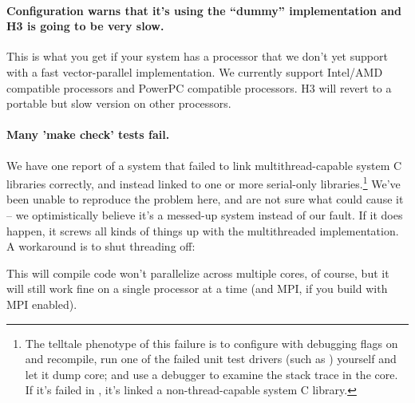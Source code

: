 
\paragraph{Configuration warns that it's using the ``dummy''
implementation and H3 is going to be very slow.} This is what you get if
your system has a processor that we don't yet support with a fast
vector-parallel implementation. We currently support Intel/AMD
compatible processors and PowerPC compatible processors.  H3 will
revert to a portable but slow version on other processors.

\paragraph{Many 'make check' tests fail.} We have one report of a
system that failed to link multithread-capable system C libraries
correctly, and instead linked to one or more serial-only
libraries.\footnote{The telltale phenotype of this failure is to
  configure with debugging flags on and recompile, run one of the
  failed unit test drivers (such as )
  yourself and let it dump core; and use a debugger to examine the
  stack trace in the core. If it's failed in
  , it's linked a non-thread-capable
  system C library.} We've been unable to reproduce the problem here,
and are not sure what could cause it -- we optimistically believe it's
a messed-up system instead of our fault. If it does happen, it screws
all kinds of things up with the multithreaded implementation. A
workaround is to shut threading off:


This will compile code won't parallelize across multiple cores, of
course, but it will still work fine on a single processor at a time
(and MPI, if you build with MPI enabled).

